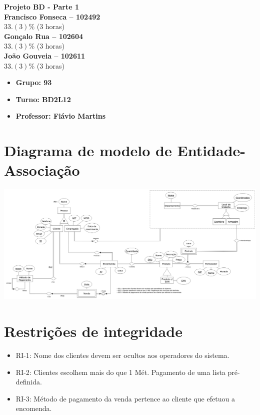 \documentclass{article}
\begin{document}
\begin{titlepage}

    \begin{center}
        {\Huge\bfseries Projeto BD - Parte 1\\}
        \vspace{1cm}
        {\Large\bfseries Francisco Fonseca -- 102492}\\[5pt]
        $33.(3)\%$ (3 horas)\\[14pt]
        {\Large\bfseries Gonçalo Rua -- 102604}\\[5pt]
        $33.(3)\%$ (3 horas)\\[14pt]
        {\Large\bfseries João Gouveia -- 102611}\\[5pt]
        $33.(3)\%$ (3 horas)\\[14pt]
    \end{center}

    \vspace{0.5cm}

    \begin{itemize}
        \item[] \Large\bfseries Grupo: 93
        \item[] \Large\bfseries Turno: BD2L12
        \item[] \Large\bfseries Professor: Flávio Martins
    \end{itemize}

\end{titlepage}

\section{Diagrama de modelo de Entidade-Associação}

\vspace{0.5cm}
\includegraphics[scale=0.2]{diagrama.png}
\vspace{0.5cm}

\section{Restrições de integridade}

\begin{itemize}
    \item RI-1: Nome dos clientes devem ser ocultos aos operadores do sistema.
    \item RI-2: Clientes escolhem mais do que 1 Mét. Pagamento de uma lista pré-definida.
    \item RI-3: Método de pagamento da venda pertence ao cliente que efetuou a encomenda.
\end{itemize}
\end{document}
